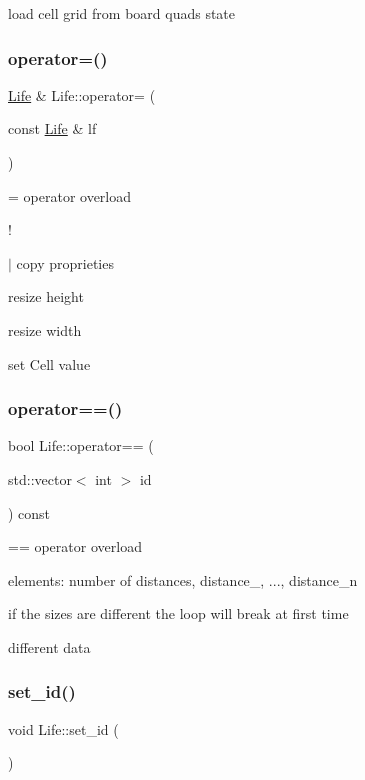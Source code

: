 load cell grid from board quads state 

\mbox{\label{classLife_a79902e1e85146df19fb2b920899a5a36}} 
\subsubsection{\texorpdfstring{operator=()}{operator=()}}
{\footnotesize\ttfamily \hyperlink{classLife}{Life} \& Life\+::operator= (\begin{DoxyParamCaption}\item[{const \hyperlink{classLife}{Life} \&}]{lf }\end{DoxyParamCaption})}



= operator overload 

!

$\vert$ copy proprieties

resize height

resize width

set Cell value \mbox{\label{classLife_ae0d444c42adbb8784684f2a9ef008bcb}} 
\subsubsection{\texorpdfstring{operator==()}{operator==()}}
{\footnotesize\ttfamily bool Life\+::operator== (\begin{DoxyParamCaption}\item[{std\+::vector$<$ int $>$}]{id }\end{DoxyParamCaption}) const}



== operator overload 

elements\+: number of distances, distance\+\_, ..., distance\+\_\+n

if the sizes are different the loop will break at first time

different data \mbox{\label{classLife_a085768fbd7a228f0e4323208dbe99a0a}} 
\subsubsection{\texorpdfstring{set\+\_\+id()}{set\_id()}}
{\footnotesize\ttfamily void Life\+::set\+\_\+id (\begin{DoxyParamCaption}{ }\end{DoxyParamCaption})}



